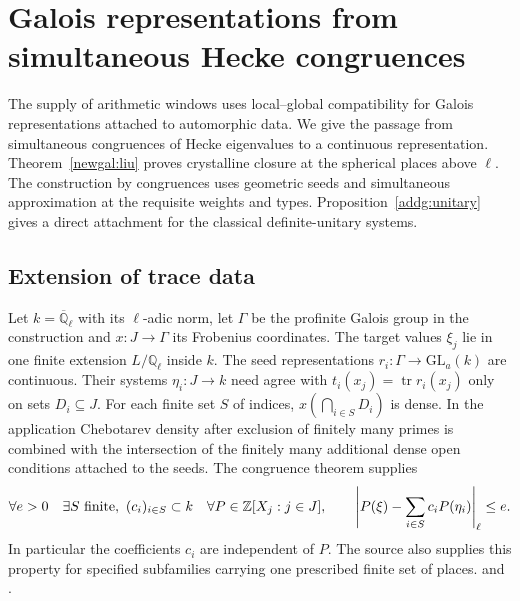 \section{Galois representations from simultaneous Hecke congruences}\label{tr:section}

The supply of arithmetic windows uses local--global compatibility for Galois representations attached to automorphic data. We give the passage from simultaneous congruences of Hecke eigenvalues to a continuous representation. Theorem~\ref{newgal:liu} proves crystalline closure at the spherical places above \(\ell\). The construction by congruences uses geometric seeds and simultaneous approximation at the requisite weights and types. Proposition~\ref{addg:unitary} gives a direct attachment for the classical definite-unitary systems.

\subsection{Extension of trace data}
Let \(k=\overline{\mathbb Q}_\ell\) with its \(\ell\)-adic norm, let \(\Gamma\) be the profinite Galois group in the construction and \(x:J\to\Gamma\) its Frobenius coordinates. The target values \(\xi_j\) lie in one finite extension \(L/\mathbb Q_\ell\) inside \(k\). The seed representations \(r_i:\Gamma\to\mathrm{GL}_a(k)\) are continuous. Their systems \(\eta_i:J\to k\) need agree with \(t_i(x_j)=\operatorname{tr}r_i(x_j)\) only on sets \(D_i\subseteq J\). For each finite set \(S\) of indices, \(x(\bigcap_{i\in S}D_i)\) is dense. In the application Chebotarev density after exclusion of finitely many primes is combined with the intersection of the finitely many additional dense open conditions attached to the seeds. The congruence theorem supplies
\begin{equation}\label{tr:approx}
 \forall e>0\quad \exists S\ {\rm finite},\ (c_i)_{i\in S}\subset k\quad
 \forall P\in\mathbb Z[X_j:j\in J],\qquad
 \left|P(\xi)-\sum_{i\in S}c_iP(\eta_i)\right|_\ell\le e.
\end{equation}
In particular the coefficients \(c_i\) are independent of \(P\). The source also supplies this property for specified subfamilies carrying one prescribed finite set of places.  and .

